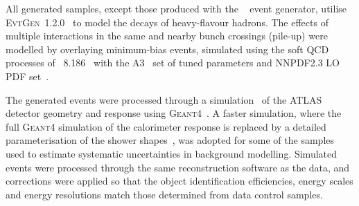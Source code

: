 \documentclass[PAPER, coverpage, atlasdraft=true, texlive=2016, UKenglish]{\ATLASLATEXPATH atlasdoc}
\begin{document}
All generated samples, except those produced with the {\sherpa}~\cite{Gleisberg:2008ta} event generator, 
utilise \textsc{EvtGen}~1.2.0~\cite{Lange:2001uf} to model the decays of heavy-flavour hadrons. 
The effects of multiple interactions in the same and nearby bunch crossings (pile-up) were modelled by overlaying minimum-bias events, simulated using the soft QCD processes of {\pythia}~8.186~\cite{Sjostrand:2006za} with the A3~\cite{ATL-PHYS-PUB-2016-017} set of tuned parameters and NNPDF2.3 LO PDF set~\cite{Ball:2012cx}.

The generated events were processed through a simulation~\cite{Aad:2010ah} of the ATLAS detector geometry and response 
using \textsc{Geant4}~\cite{Agostinelli:2002hh}. A faster simulation, where the full \textsc{Geant4} simulation of
the calorimeter response is replaced by a detailed parameterisation of the shower shapes~\cite{FastCaloSim},
was adopted for some of the samples used to estimate systematic uncertainties in background modelling.
Simulated events were processed through the same reconstruction software as the data, and corrections were applied so that the object identification 
efficiencies, energy scales and energy resolutions match those determined from data control samples.
\end{document}
